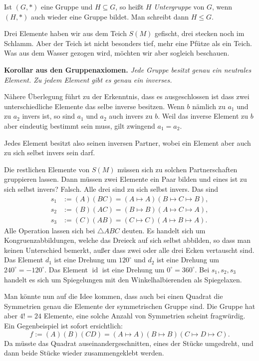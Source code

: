 \documentclass[a4paper,11pt,fleqn,twoside]{scrartcl}
\numberwithin{equation}{section}
\newcommand{\id}{\operatorname{id}}
\newcommand{\strong}[1]{{\sf\bfseries #1}}
\newenvironment{Definition}{\strong{Definition.}}{\par}
\begin{document}
\begin{Definition}
Ist $(G,*)$ eine Gruppe und $H\subseteq G$, so heißt $H$
\emph{Untergruppe} von $G$, wenn $(H,*)$ auch wieder eine Gruppe
bildet. Man schreibt dann $H\le G$.
\end{Definition}
Drei Elemente haben wir aus dem Teich $S(M)$ gefischt, drei
stecken noch im Schlamm. Aber der Teich ist nicht besonders tief,
mehr eine Pfütze als ein Teich. Was aus dem Wasser gezogen wird,
möchten wir aber sogleich beschauen.

\strong{Korollar aus den Gruppenaxiomen.} \emph{Jede Gruppe
besitzt genau ein neutrales Element. Zu jedem Element gibt
es genau ein inverses.}

Nähere Überlegung führt zu der Erkenntnis, dass es ausgeschlossen
ist dass zwei unterschiedliche Elemente das selbe inverse besitzen.
Wenn $b$ nämlich
zu $a_1$ und zu $a_2$ invers ist, so sind $a_1$ und $a_2$ auch invers
zu $b$. Weil das inverse Element zu $b$ aber eindeutig bestimmt sein
muss, gilt zwingend $a_1=a_2$.

Jedes Element besitzt also seinen inversen Partner,
wobei ein Element aber auch zu sich selbst invers sein darf.

Die restlichen Elemente von $S(M)$ müssen sich zu solchen
Partnerschaften gruppieren lassen. Dann müssen zwei Elemente
ein Paar bilden und eines ist zu sich selbst invers? Falsch.
Alle drei sind zu sich selbst invers. Das sind
\begin{align}\label{eq:Spiegelung1}
s_1&:= (A)(BC) = (A\mapsto A)(B\mapsto C\mapsto B),\\
s_2&:= (B)(AC) = (B\mapsto B)(A\mapsto C\mapsto A),\\
s_3&:= (C)(AB) = (C\mapsto C)(A\mapsto B\mapsto A).
\end{align}
Alle Operation lassen sich bei $\triangle ABC$ deuten.
Es handelt sich um Kongruenzabbildungen, welche das Dreieck
auf sich selbst abbilden, so dass man keinen Unterschied
bemerkt, außer dass zwei oder alle drei Ecken vertauscht sind.
Das Element $d_1$ ist eine Drehung um $120^\circ$ und $d_2$ ist
eine Drehung um $240^\circ = -120^\circ$. Das Element $\id$
ist eine Drehung um $0^\circ = 360^\circ$. Bei $s_1,s_2,s_3$
handelt es sich um Spiegelungen mit den Winkelhalbierenden
als Spiegelaxen.

Man könnte nun auf die Idee kommen, dass auch bei einen Quadrat
die Symmetrien genau die Elemente der symmetrischen Gruppe sind.
Die Gruppe hat aber $4!=24$ Elemente, eine solche Anzahl von
Symmetrien scheint fragwürdig. Ein Gegenbeispiel ist sofort
ersichtlich:
\begin{equation}
f := (A)(B)(CD) = (A\mapsto A)(B\mapsto B)(C\mapsto D\mapsto C).
\end{equation}
Da müsste das Quadrat auseinandergeschnitten, eines der Stücke
umgedreht, und dann beide Stücke wieder zusammengeklebt werden.
\end{document}
